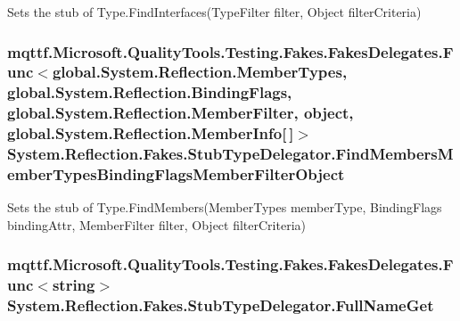Sets the stub of Type.\-Find\-Interfaces(\-Type\-Filter filter, Object filter\-Criteria)

\hypertarget{class_system_1_1_reflection_1_1_fakes_1_1_stub_type_delegator_a74b417d03402e2240f6f64fb76f55508}{
\subsubsection[{Find\-Members\-Member\-Types\-Binding\-Flags\-Member\-Filter\-Object}]{\setlength{\rightskip}{0pt plus 5cm}mqttf.\-Microsoft.\-Quality\-Tools.\-Testing.\-Fakes.\-Fakes\-Delegates.\-Func$<$global.\-System.\-Reflection.\-Member\-Types, global.\-System.\-Reflection.\-Binding\-Flags, global.\-System.\-Reflection.\-Member\-Filter, object, global.\-System.\-Reflection.\-Member\-Info\mbox{[}$\,$\mbox{]}$>$ System.\-Reflection.\-Fakes.\-Stub\-Type\-Delegator.\-Find\-Members\-Member\-Types\-Binding\-Flags\-Member\-Filter\-Object}}\label{class_system_1_1_reflection_1_1_fakes_1_1_stub_type_delegator_a74b417d03402e2240f6f64fb76f55508}


Sets the stub of Type.\-Find\-Members(\-Member\-Types member\-Type, Binding\-Flags binding\-Attr, Member\-Filter filter, Object filter\-Criteria)

\hypertarget{class_system_1_1_reflection_1_1_fakes_1_1_stub_type_delegator_afaf282989415c99f09caea9e31cb2a70}{
\subsubsection[{Full\-Name\-Get}]{\setlength{\rightskip}{0pt plus 5cm}mqttf.\-Microsoft.\-Quality\-Tools.\-Testing.\-Fakes.\-Fakes\-Delegates.\-Func$<$string$>$ System.\-Reflection.\-Fakes.\-Stub\-Type\-Delegator.\-Full\-Name\-Get}}\label{class_system_1_1_reflection_1_1_fakes_1_1_stub_type_delegator_afaf282989415c99f09caea9e31cb2a70}


